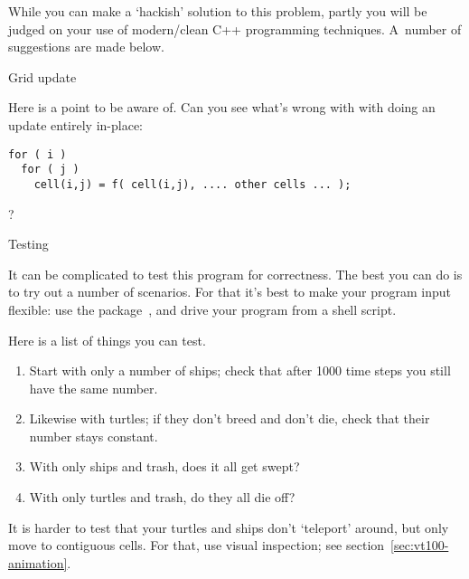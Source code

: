 While you can make a `hackish' solution to this problem,
partly you will be judged on your use of modern/clean C++ programming techniques.
A~number of suggestions are made below.

 {Grid update}

Here is a point to be aware of.
Can you see what's wrong with with doing an update entirely in-place:
\begin{lstlisting}
for ( i )
  for ( j )
    cell(i,j) = f( cell(i,j), .... other cells ... );
\end{lstlisting}
?

 {Testing}

It can be complicated to test this program for correctness.
The best you can do is to try out a number of scenarios.
For that it's best to make your program input flexible:
use the  package~\cite{cxxopts},
and drive your program from a shell script.

Here is a list of things you can test.
\begin{enumerate}
\item Start with only a number of ships;
  check that after 1000 time steps you still have the same number.
\item Likewise with turtles;
  if they don't breed and don't die, check that their number stays constant.
\item With only ships and trash, does it all get swept?
\item With only turtles and trash, do they all die off?
\end{enumerate}

It is harder to test that your turtles and ships don't `teleport' around,
but only move to contiguous cells. For that, use visual inspection;
see section~\ref{sec:vt100-animation}.

